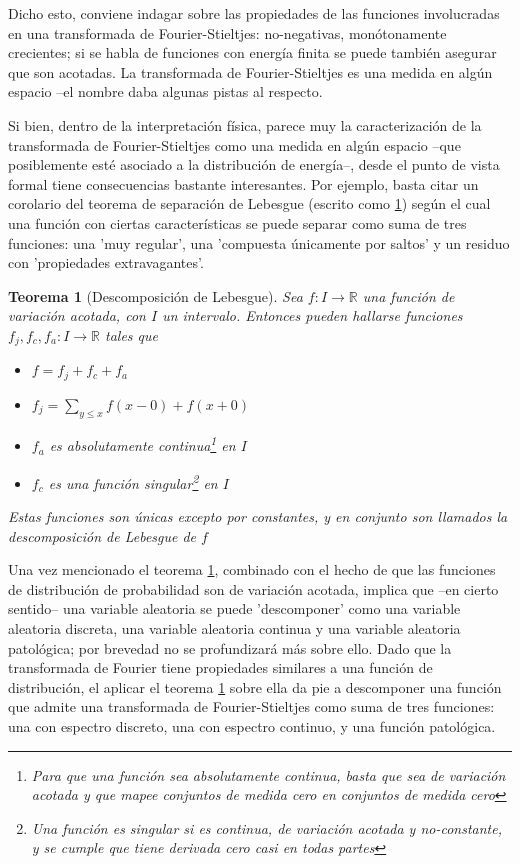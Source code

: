 \documentclass[12pt,a4paper]{mitthesis}
\newtheorem{thrm}{Teorema}
\newcommand{\R}{\mathbb{R}}
\begin{document}
Dicho esto, conviene indagar sobre las propiedades de las funciones involucradas en una 
transformada de Fourier-Stieltjes: no-negativas, monótonamente crecientes; si se habla de funciones
con energ\'ia finita se puede tambi\'en asegurar que son acotadas. La transformada de 
Fourier-Stieltjes es una medida en alg\'un espacio --el nombre daba algunas pistas al respecto. 

Si bien, dentro de la interpretaci\'on f\'isica, parece muy la caracterizaci\'on de la transformada 
de Fourier-Stieltjes como una medida en alg\'un espacio --que posiblemente est\'e asociado a la 
distribuci\'on de energ\'ia--, desde el punto de vista formal tiene consecuencias bastante 
interesantes.
Por ejemplo, basta citar un corolario del teorema de separaci\'on de Lebesgue (escrito como 
\ref{Lebesgue_decomp}) seg\'un el cual una funci\'on con ciertas caracter\'isticas se puede separar 
como suma de tres funciones: una 'muy regular', una 'compuesta \'unicamente por saltos' y 
un residuo con 'propiedades extravagantes'.

\begin{thrm}[Descomposici\'on de Lebesgue]
Sea $f:I\rightarrow \R$ una funci\'on de variaci\'on acotada, con $I$ un intervalo. Entonces pueden 
hallarse funciones $f_j, f_c, f_a :I\rightarrow \R$ tales que
\begin{itemize}
\item $f = f_j+ f_c+ f_a$
\item $f_j = \sum_{y \leq x} f(x-0) + f(x+0)$
\item $f_a$ es absolutamente continua\footnote{Para que una funci\'on sea absolutamente continua,
basta que sea de variaci\'on acotada y que mapee conjuntos de medida cero en conjuntos de medida
cero} en $I$
\item $f_c$ es una funci\'on singular\footnote{Una funci\'on es singular si es continua, de 
variaci\'on acotada y no-constante, y se cumple que tiene derivada cero casi en todas partes} en 
$I$
\end{itemize}
Estas funciones son \'unicas excepto por constantes, y en conjunto son llamados la 
\textit{descomposici\'on de Lebesgue} de $f$
\label{Lebesgue_decomp}
\end{thrm}

Una vez mencionado el teorema \ref{Lebesgue_decomp}, combinado con el hecho de que las funciones de 
distribuci\'on de probabilidad son de variaci\'on acotada, implica que --en cierto sentido-- una 
variable aleatoria se puede 'descomponer' como una variable aleatoria discreta, una variable 
aleatoria continua y una variable aleatoria patol\'ogica; por brevedad no se profundizar\'a m\'as 
sobre ello.
Dado que la transformada de Fourier tiene propiedades similares a una funci\'on de distribuci\'on,
el aplicar el teorema \ref{Lebesgue_decomp} sobre ella da pie a descomponer una funci\'on que 
admite una transformada de Fourier-Stieltjes como suma de tres funciones: una con espectro 
discreto, una con espectro continuo, y una funci\'on patol\'ogica.
\end{document}
